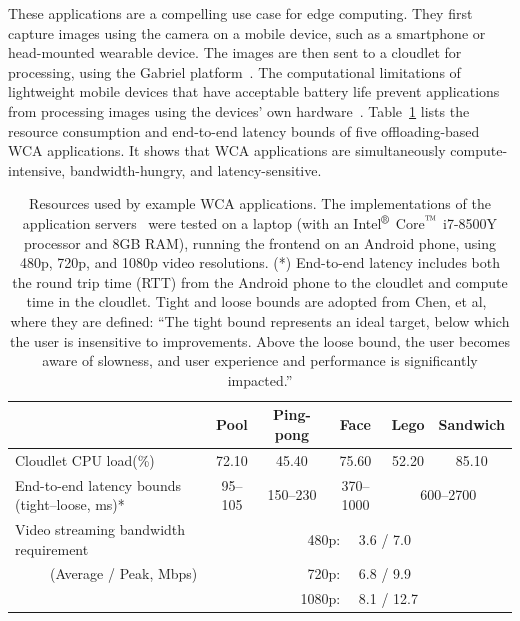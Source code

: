 These applications are a compelling use case for edge computing.
They first capture images using the camera on a mobile device, such as a
smartphone or head-mounted wearable device.
The images are then sent to a cloudlet for processing, using the Gabriel
platform~\cite{ha2014}.
The computational limitations of lightweight mobile devices that have acceptable
battery life prevent applications from processing images using the
devices' own hardware~{\cite{Satya2009}}.
Table~\ref{fig:wca_apps} lists the resource consumption and end-to-end latency
bounds of five offloading-based WCA applications.
It shows that WCA applications are simultaneously compute-intensive,
bandwidth-hungry, and latency-sensitive.

\begin{table}
    \begin{tabular}{|l||c|c|c|c|c|}
    \hline
    & Pool & Ping-pong & Face & Lego & Sandwich \\
    \hline
    \hline
    Cloudlet CPU load(\%) & 72.10 & 45.40 & 75.60 & 52.20 & 85.10 \\
    \hline
    End-to-end latency bounds (tight--loose, ms)* & 95--105 & 150--230 & 370--1000 & \multicolumn{2}{c|}{600--2700} \\
    \hline
    Video streaming bandwidth requirement    & \multicolumn{5}{c|}{480p:~~ 3.6 / 7.0} \\
    ~~~~~(Average / Peak, Mbps)              & \multicolumn{5}{c|}{720p:~~ 6.8 / 9.9} \\
                                             & \multicolumn{5}{c|}{1080p:~~ 8.1 / 12.7} \\
    \hline
    \end{tabular}
    \caption[Resources used by example WCA applications]{
      Resources used by example WCA applications.
      The implementations of the application servers~\cite{chen2017} were tested
      on a laptop (with an Intel$^{\mbox{\footnotesize\textregistered}}$
      Core$^{\mbox{\footnotesize\texttrademark}}$ i7-8500Y processor and 8GB RAM),
      running the frontend on an Android phone, using 480p, 720p, and 1080p
      video resolutions.
      (*) End-to-end latency includes both the round trip time (RTT) from the
      Android phone to the cloudlet and compute time in the cloudlet.
      Tight and loose bounds are adopted from Chen, et al,~\cite{chen2017}
      where they are defined:
      ``The tight bound represents an ideal target, below which the user is
      insensitive to improvements. Above the loose bound, the user becomes aware
      of slowness, and user experience and performance is significantly
      impacted.''
    }\label{fig:wca_apps}
\end{table}

